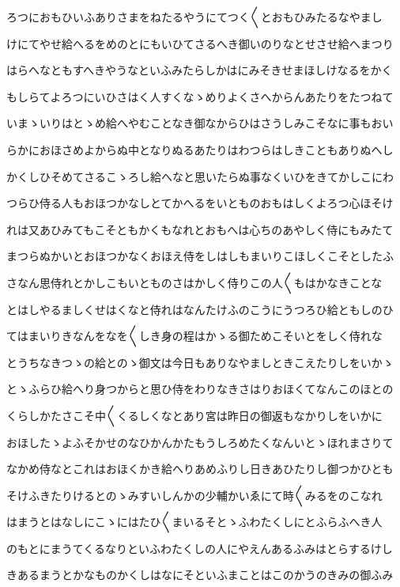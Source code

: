 \documentclass[a4paper,11pt,landscape]{ltjtarticle}
\begin{document}
ろつにおもひいふありさまをねたるやうにてつく〱とおもひみたるなやまし
\par\medskip
けにてやせ給へるをめのとにもいひてさるへき御いのりなとせさせ給へまつり
\par\medskip
はらへなともすへきやうなといふみたらしかはにみそきせまほしけなるをかく
\par\medskip
もしらてよろつにいひさはく人すくなゝめりよくさへからんあたりをたつねて
\par\medskip
いまゝいりはとゝめ給へやむことなき御なからひはさうしみこそなに事もおい
\par\medskip
らかにおほさめよからぬ中となりぬるあたりはわつらはしきこともありぬへし
\par\medskip
かくしひそめてさるこゝろし給へなと思いたらぬ事なくいひをきてかしこにわ
\par\medskip
つらひ侍る人もおほつかなしとてかへるをいとものおもはしくよろつ心ほそけ
\par\medskip
れは又あひみてもこそともかくもなれとおもへは心ちのあやしく侍にもみたて
\par\medskip
まつらぬかいとおほつかなくおほえ侍をしはしもまいりこほしくこそとしたふ
\par\medskip
さなん思侍れとかしこもいとものさはかしく侍りこの人〱もはかなきことな
\par\medskip
とはしやるましくせはくなと侍れはなんたけふのこうにうつろひ給ともしのひ
\par\medskip
てはまいりきなんをなを〱しき身の程はかゝる御ためこそいとをしく侍れな
\par\medskip
とうちなきつゝの給とのゝ御文は今日もありなやましときこえたりしをいかゝ
\par\medskip
とゝふらひ給へり身つからと思ひ侍をわりなきさはりおほくてなんこのほとの
\par\medskip
くらしかたさこそ中〱くるしくなとあり宮は昨日の御返もなかりしをいかに
\par\medskip
おほしたゝよふそかせのなひかんかたもうしろめたくなんいとゝほれまさりて
\par\medskip
なかめ侍なとこれはおほくかき給へりあめふりし日きあひたりし御つかひとも
\par\medskip
そけふきたりけるとのゝみすいしんかの少輔かいゑにて時〱みるをのこなれ
\par\medskip
はまうとはなしにこゝにはたひ〱まいるそとゝふわたくしにとふらふへき人
\par\medskip
のもとにまうてくるなりといふわたくしの人にやえんあるふみはとらするけし
\par\medskip
きあるまうとかなものかくしはなにそといふまことはこのかうのきみの御ふみ
\end{document}
